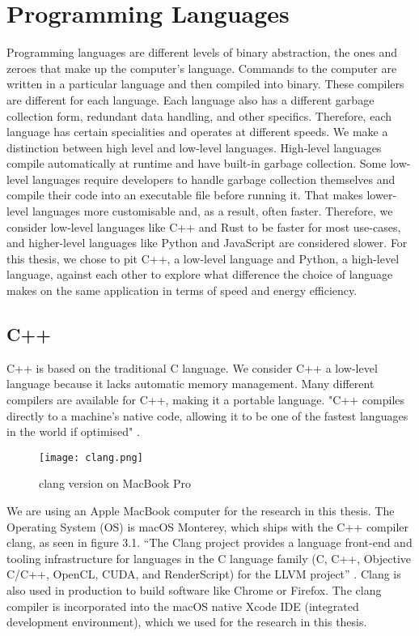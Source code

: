 \chapter{Programming Languages}

Programming languages are different levels of binary abstraction, the ones and zeroes that make up the computer's language. Commands to the computer are written in a particular language and then compiled into binary.
These compilers are different for each language. Each language also has a different garbage collection form, redundant data handling, and other specifics. Therefore, each language has certain specialities and operates at different speeds.
We make a distinction between high level and low-level languages. High-level languages compile automatically at runtime and have built-in garbage collection. Some low-level languages require developers to handle garbage collection themselves and compile their code into an executable file before running it.
That makes lower-level languages more customisable and, as a result, often faster.
Therefore, we consider low-level languages like C++ and Rust to be faster for most use-cases, and higher-level languages like Python and JavaScript are considered slower.
For this thesis, we chose to pit C++, a low-level language and Python, a high-level language, against each other to explore what difference the choice of language makes on the same application in terms of speed and energy efficiency.

\section{C++}
C++ is based on the traditional C language. We consider C++  a low-level language because it lacks automatic memory management. Many different compilers are available for C++, making it a portable language. "C++ compiles directly to a machine's native code, allowing it to be one of the fastest languages in the world if optimised" \cite{C++}.

\begin{figure}[htbp]
	\centering
	\texttt{[image: clang.png]}
	\caption{clang version on MacBook Pro}
	\label{figure:clang}
\end{figure}

We are using an Apple MacBook computer for the research in this thesis. The Operating System (OS) is macOS Monterey, which ships with the C++ compiler clang, as seen in figure 3.1. “The Clang project provides a language front-end and tooling infrastructure for languages in the C language family (C, C++, Objective C/C++, OpenCL, CUDA, and RenderScript) for the LLVM project” \cite{clang}. Clang is also used in production to build software like Chrome or Firefox. The clang compiler is incorporated into the macOS native Xcode IDE (integrated development environment), which we used for the research in this thesis.

